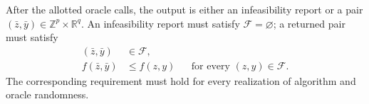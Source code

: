 \documentclass[10pt]{article}
\theoremstyle{definition}
\begin{document}
After the allotted oracle calls, the output is either an infeasibility report or a pair $(\bar z,\bar y)\in\mathbb{Z}^p\times\mathbb{R}^q$. An infeasibility report must satisfy $\mathcal{F}=\varnothing$; a returned pair must satisfy
\[
\begin{aligned}
(\bar z,\bar y)&\in\mathcal{F},\\
f(\bar z,\bar y)&\leq f(z,y)
&&\text{for every }(z,y)\in\mathcal{F}.
\end{aligned}
\]
The corresponding requirement must hold for every realization of algorithm and oracle randomness.
\end{document}
